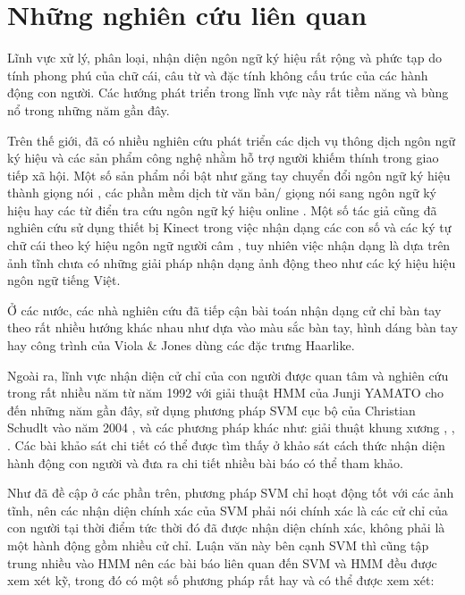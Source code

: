 \section{Những nghiên cứu liên quan}
\label{ss:nghien_cuu_lien_quan}
Lĩnh vực xử lý, phân loại, nhận diện ngôn ngữ ký hiệu rất rộng và phức tạp do tính phong phú của chữ cái, câu từ và đặc tính không cấu trúc của các hành động con người. Các hướng phát triển trong lĩnh vực này rất tiềm năng và bùng nổ trong những năm gần đây.

Trên thế giới, đã có nhiều nghiên cứu phát triển các dịch vụ thông dịch ngôn ngữ ký hiệu và các sản phẩm công nghệ nhằm hỗ trợ người khiếm thính trong giao tiếp xã hội. Một số sản phẩm nổi bật như găng tay chuyển đổi ngôn ngữ ký hiệu thành giọng nói \cite{tl1}, các phần mềm dịch từ văn bản/ giọng nói sang ngôn ngữ ký hiệu hay các từ điển tra cứu ngôn ngữ ký hiệu online \cite{tl2}. Một số tác giả cũng đã nghiên cứu sử dụng thiết bị Kinect trong việc nhận dạng các con số và các ký tự chữ cái theo ký hiệu ngôn ngữ người câm \cite{tl3}, tuy nhiên việc nhận dạng là dựa trên ảnh tĩnh chưa có những giải pháp nhận dạng ảnh động theo như các ký hiệu hiệu ngôn ngữ tiếng Việt.

Ở các nước, các nhà nghiên cứu đã tiếp cận bài toán nhận dạng cử chỉ bàn tay theo rất nhiều hướng khác nhau như dựa vào màu sắc bàn tay, hình dáng bàn tay hay công trình của Viola $\&$ Jones dùng các đặc trưng Haarlike.

Ngoài ra, lĩnh vực nhận diện cử chỉ của con người được quan tâm và nghiên cứu trong rất nhiều năm từ năm 1992 \cite{Yamato} với giải thuật HMM của Junji YAMATO cho đến những năm gần đây, sử dụng phương pháp SVM cục bộ của Christian Schudlt vào năm 2004 \cite{Schuldt:2004:RHA:1018429.1020906}, và các phương pháp khác như: giải thuật khung xương \cite{Chen:2006:HAR:1178782.1178808}, \cite{Forsyth}, \cite{With}. Các bài khảo sát chi tiết có thể được tìm thấy ở \cite{Cristani201386} khảo sát cách thức nhận diện hành động con người và đưa ra chi tiết nhiều bài báo có thể tham khảo.

Như đã đề cập ở các phần trên, phương pháp SVM chỉ hoạt động tốt với các ảnh tĩnh, nên các nhận diện chính xác của SVM phải nói chính xác là các cử chỉ của con người tại thời điểm tức thời đó đã được nhận diện chính xác, không phải là một hành động gồm nhiều cử chỉ. Luận văn này bên cạnh SVM thì cũng tập trung nhiều vào HMM nên các bài báo liên quan đến SVM và HMM đều được xem xét kỹ, trong đó có một số phương pháp rất hay và có thể được xem xét:

